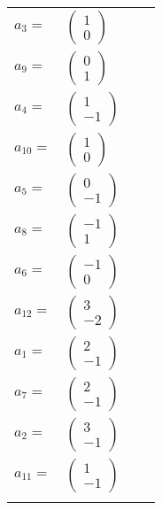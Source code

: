\documentclass[1p]{elsarticle_modified}
\theoremstyle{definition}
\begin{document}
\begin{tabular}{m{7pt} m{180pt} m{7pt} m{180pt} }
\flushright $a_{3}=$&$\begin{pmatrix}1\\0\end{pmatrix}$ \\
\flushright $a_{9}=$&$\begin{pmatrix}0\\1\end{pmatrix}$ \\
\flushright $a_{4}=$&$\begin{pmatrix}1\\-1\end{pmatrix}$ \\
\flushright $a_{10}=$&$\begin{pmatrix}1\\0\end{pmatrix}$ \\
\flushright $a_{5}=$&$\begin{pmatrix}0\\-1\end{pmatrix}$ \\
\flushright $a_{8}=$&$\begin{pmatrix}-1\\1\end{pmatrix}$ \\
\flushright $a_{6}=$&$\begin{pmatrix}-1\\0\end{pmatrix}$ \\
\flushright $a_{12}=$&$\begin{pmatrix}3\\-2\end{pmatrix}$ \\
\flushright $a_{1}=$&$\begin{pmatrix}2\\-1\end{pmatrix}$ \\
\flushright $a_{7}=$&$\begin{pmatrix}2\\-1\end{pmatrix}$ \\
\flushright $a_{2}=$&$\begin{pmatrix}3\\-1\end{pmatrix}$ \\
\flushright $a_{11}=$&$\begin{pmatrix}1\\-1\end{pmatrix}$\\&\end{tabular}
\end{document}
